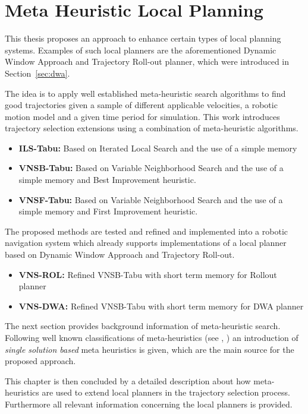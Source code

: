 \chapter{Meta Heuristic Local Planning}\label{ch:meta}

This thesis proposes an approach to enhance certain types of local planning systems.
Examples of such local planners are the aforementioned Dynamic Window Approach and Trajectory Roll-out planner, which were introduced in Section~\ref{sec:dwa}.

The idea is to apply well established meta-heuristic search algorithms to find good trajectories given a sample of different applicable velocities, a robotic motion model and a given time period for simulation.
This work introduces trajectory selection extensions using a combination of meta-heuristic algorithms.

\begin{itemize}
\item{\bf{ILS-Tabu:}}  Based on Iterated Local Search and the use of a simple memory
\item{\bf{VNSB-Tabu:}} Based on Variable Neighborhood Search and the use of a simple memory and Best Improvement heuristic.
\item{\bf{VNSF-Tabu:}} Based on Variable Neighborhood Search and the use of a simple memory and First Improvement heuristic.
\end{itemize}

The proposed methods are tested and refined and implemented into a robotic navigation system which already supports implementations of a local planner based on Dynamic Window Approach and Trajectory Roll-out.

\begin{itemize}
\item{\bf{VNS-ROL:}} Refined VNSB-Tabu with short term memory for Rollout planner
\item{\bf{VNS-DWA:}} Refined VNSB-Tabu with short term memory for DWA planner
\end{itemize}

The next section provides background information of meta-heuristic search. 
Following well known classifications of meta-heuristics (see \cite{blum2003metaheuristics}, \cite{birattari2001classification} ) an introduction of \emph{single solution based} meta heuristics is given, which are the main source for the proposed approach. 

This chapter is then concluded by a detailed description about how meta-heuristics are used to extend local planners in the trajectory selection process. 
Furthermore all relevant information concerning the local planners is provided. 

